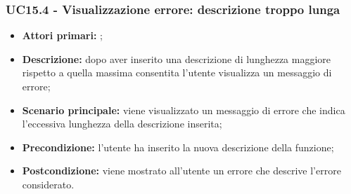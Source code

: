 \subsubsection{UC15.4 - Visualizzazione errore: descrizione troppo lunga}
\begin{itemize}
	\item \textbf{Attori primari:} \us{};
	\item \textbf{Descrizione:} dopo aver inserito una descrizione di lunghezza maggiore rispetto a quella massima consentita l’utente visualizza un messaggio di errore; 
	\item \textbf{Scenario principale:} viene visualizzato un messaggio di errore che indica l’eccessiva lunghezza della descrizione inserita;  
	\item \textbf{Precondizione:} l’utente ha inserito la nuova descrizione della funzione;  
	\item \textbf{Postcondizione:} viene mostrato all’utente un errore che descrive l’errore considerato.  
\end{itemize}